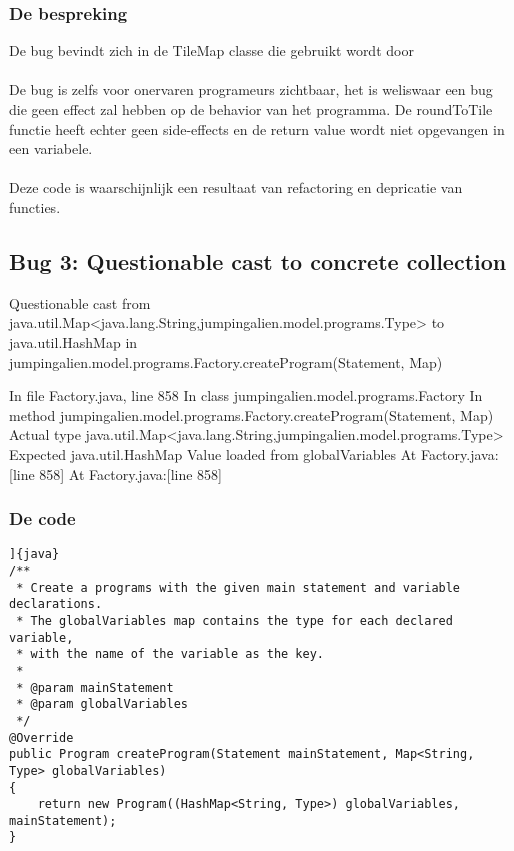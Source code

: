 \documentclass[a4paper]{article}
\begin{document}
\subsubsection{De bespreking}
De bug bevindt zich in de TileMap classe die gebruikt wordt door
\paragraph{}
De bug is zelfs voor onervaren programeurs zichtbaar, het is weliswaar een bug die geen effect zal hebben op de behavior van het programma. De roundToTile functie heeft echter geen side-effects en de return value wordt niet opgevangen in een variabele.
\paragraph{}
Deze code is waarschijnlijk een resultaat van refactoring en depricatie van functies.

\subsection{Bug 3: Questionable cast to concrete collection}
Questionable cast from java.util.Map<java.lang.String,jumpingalien.model.programs.Type> to java.util.HashMap in jumpingalien.model.programs.Factory.createProgram(Statement, Map)

In file Factory.java, line 858
In class jumpingalien.model.programs.Factory
In method jumpingalien.model.programs.Factory.createProgram(Statement, Map)
Actual type java.util.Map<java.lang.String,jumpingalien.model.programs.Type>
Expected java.util.HashMap
Value loaded from globalVariables
At Factory.java:[line 858]
At Factory.java:[line 858]
\subsubsection{De code}
\begin{verbatim}]{java}
/**
 * Create a programs with the given main statement and variable declarations.
 * The globalVariables map contains the type for each declared variable,
 * with the name of the variable as the key.
 *
 * @param mainStatement
 * @param globalVariables
 */
@Override
public Program createProgram(Statement mainStatement, Map<String, Type> globalVariables)
{
	return new Program((HashMap<String, Type>) globalVariables, mainStatement);
}
\end{verbatim}
\end{document}
